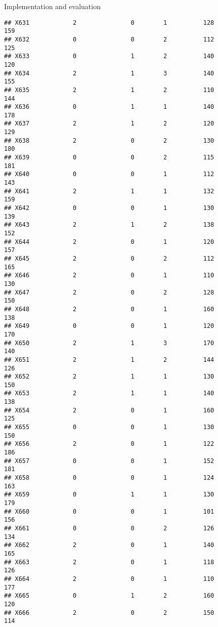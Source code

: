 \documentclass[
  ignorenonframetext,
]{beamer}
\begin{document}
\begin{frame}[fragile]{Implementation and evaluation}
\begin{verbatim}
## X631            2               0        1          128            159
## X632            0               0        2          112            125
## X633            0               1        2          140            120
## X634            2               1        3          140            155
## X635            2               1        2          110            144
## X636            0               1        1          140            178
## X637            2               1        2          120            129
## X638            2               0        2          130            180
## X639            0               0        2          115            181
## X640            0               0        1          112            143
## X641            2               1        1          132            159
## X642            0               0        1          130            139
## X643            2               1        2          138            152
## X644            2               0        1          120            157
## X645            2               0        2          112            165
## X646            2               0        1          110            130
## X647            2               0        2          128            150
## X648            2               0        1          160            138
## X649            0               0        1          120            170
## X650            2               1        3          170            140
## X651            2               1        2          144            126
## X652            2               1        1          130            150
## X653            2               1        1          140            138
## X654            2               0        1          160            125
## X655            0               0        1          130            150
## X656            2               0        1          122            186
## X657            0               0        1          152            181
## X658            0               0        1          124            163
## X659            0               1        1          130            179
## X660            0               0        1          101            156
## X661            0               0        2          126            134
## X662            2               0        1          140            165
## X663            2               0        1          118            126
## X664            2               0        1          110            177
## X665            0               1        2          160            120
## X666            2               0        2          150            114

\end{verbatim}
\end{frame}
\end{document}
